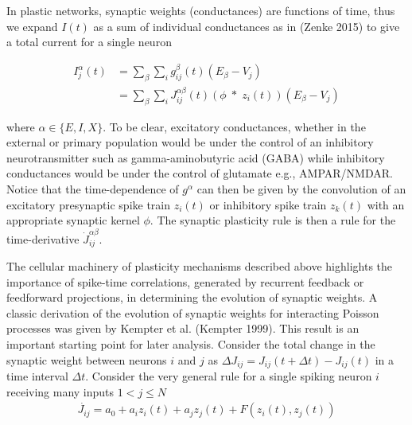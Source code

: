 \documentclass{ucetd}
\begin{document}
In plastic networks, synaptic weights (conductances) are functions of time, thus we expand $I(t)$ as a sum of individual conductances as in (Zenke 2015) to give a total current for a single neuron

\begin{align*}
I_{j}^{\alpha}(t) &= \sum_{\beta}\sum_{i} g_{ij}^{\beta}(t)(E_{\beta} - V_{j})\\
&= \sum_{\beta}\sum_{i}J_{ij}^{\alpha\beta}(t)\left(\phi\;*\;z_{i}(t)\right)(E_{\beta} - V_{j})
\end{align*}

where $\alpha \in \{E,I,X\}$. To be clear, excitatory conductances, whether in the external or primary population would be under the control of an inhibitory neurotransmitter such as gamma-aminobutyric acid (GABA) while inhibitory conductances would be under the control of glutamate e.g., AMPAR/NMDAR. Notice that the time-dependence of $g^{\alpha}$ can then be given by the convolution of an excitatory presynaptic spike train $z_{i}(t)$ or inhibitory spike train $z_{k}(t)$ with an appropriate synaptic kernel $\phi$. The synaptic plasticity rule is then a rule for the time-derivative $\dot{J}^{\alpha\beta}_{ij}$.


The cellular machinery of plasticity mechanisms described above highlights the importance of spike-time correlations, generated by recurrent feedback or feedforward projections, in determining the evolution of synaptic weights. A classic derivation of the evolution of synaptic weights for interacting Poisson processes was given by Kempter et al. (Kempter 1999). This result is an important starting point for later analysis. Consider the total change in the synaptic weight between neurons $i$ and $j$ as $\Delta J_{ij} = J_{ij}(t+\Delta t) - J_{ij}(t)$ in a time interval $\Delta t$. Consider the very general rule for a single spiking neuron $i$ receiving many inputs $1 < j \leq N$ 
\begin{align*}
\dot{J_{ij}} = a_{0} + a_{i}z_{i}(t) + a_{j}z_{j}(t) + F(z_{i}(t),z_{j}(t))
\end{align*}
\end{document}

